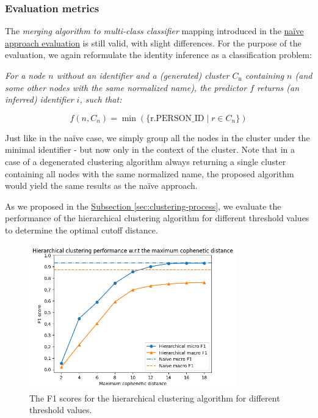 \subsubsection{Evaluation metrics}

The \textit{merging algorithm to multi-class classifier} mapping introduced in the \hyperref[sec:results-assessment]{naïve approach evaluation} is still valid, with slight differences.
For the purpose of the evaluation, we again reformulate the identity inference as a classification problem:

\textit{For a node $n$ without an identifier and a (generated) cluster $C_{\text{n}}$ containing $n$ (and some other nodes with the same normalized name),
the predictor $f$ returns (an inferred) identifier $i$, such that:}

$$
f(n, C_{n}) = \min(\{\text{r.PERSON\_ID} \mid r \in C_{n}\})
$$

Just like in the naïve case, we simply group all the nodes in the cluster under the minimal identifier - but now only in the context of the cluster.
Note that in a case of a degenerated clustering algorithm always returning a single cluster containing all nodes with the same normalized name, the proposed algorithm would yield the same results as the naïve approach.

As we proposed in the \hyperref[sec:clustering-process]{Subsection \ref*{sec:clustering-process}}, we evaluate the performance of the hierarchical clustering algorithm for different threshold values
to determine the optimal cutoff distance.

\begin{figure}[ht!]
    \captionsetup{width=.9\linewidth}
    \includegraphics[width=0.8\textwidth]{../img/hierarchical-f1.png}
    \centering
    \caption{The F1 scores for the hierarchical clustering algorithm for different threshold values.\protect\footnotemark}
\end{figure}\label{fig:hierarchical-f1}

